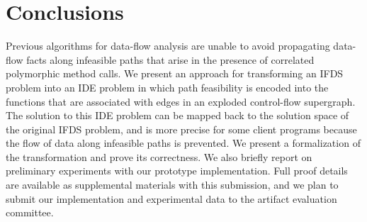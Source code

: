 \section{Conclusions}
  \label{sec:Conclusions}
  
Previous algorithms for data-flow analysis are unable to avoid propagating
data-flow facts along infeasible paths that arise in the presence of
correlated polymorphic method calls. 
% 
We present an approach for transforming an IFDS problem into an IDE problem
in which path feasibility is encoded into the functions that are associated
with edges in an exploded control-flow supergraph. The solution to this
IDE problem can be mapped back to the solution space of the original IFDS
problem, and is more precise for some client programs because the flow of data along
infeasible paths is prevented. We present a formalization of the
transformation and prove its correctness. We also briefly report on
preliminary experiments with our prototype implementation. Full proof
details are available as supplemental materials with this submission,
and we plan to submit our implementation and experimental data to the
artifact evaluation committee. 
  

